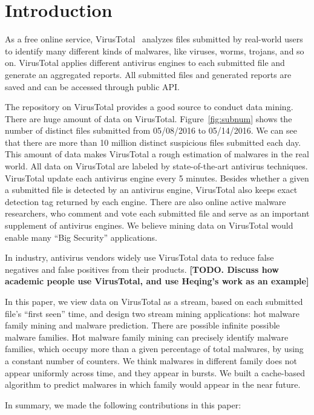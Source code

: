 \section{Introduction}

As a free online service, VirusTotal~\cite{virustotal} analyzes files submitted by real-world users to identify many different kinds of malwares, 
like viruses, worms, trojans, and so on. 
VirusTotal applies different antivirus engines to each submitted file and generate an aggregated reports. 
All submitted files and generated reports are saved and can be accessed through public API. 


The repository on VirusTotal provides a good source to conduct data mining. 
There are huge amount of data on VirusTotal.
Figure~\ref{fig:subnum} shows the number of distinct files submitted from 05/08/2016 to 05/14/2016. 
We can see that there are more than 10 million distinct suspicious files submitted each day. 
This amount of data makes VirusTotal a rough estimation of malwares in the real world. 
All data on VirusTotal are labeled by state-of-the-art antivirus techniques. 
VirusTotal update each antivirus engine every 5 minutes. 
Besides whether a given a submitted file is detected by an antivirus engine, VirusTotal also keeps exact detection tag returned by each engine. 
There are also online active malware researchers, 
who comment and vote each submitted file and serve as an important supplement of antivirus engines. 
We believe mining data on VirusTotal would enable many ``Big Security'' applications. 

In industry, antivirus vendors widely use VirusTotal data to reduce false negatives and false positives from their products. 
{\bf [TODO. Discuss how academic people use VirusTotal, and use Heqing’s work as an example]} 

In this paper, we view data on VirusTotal as a stream, based on each submitted file’s ``first seen'' time, 
and design two stream mining applications: hot malware family mining and malware prediction. 
There are possible infinite possible malware families. 
Hot malware family mining can precisely identify malware families, 
which occupy more than a given percentage of total malwares, by using a constant number of counters.  
We think malwares in different family does not appear uniformly across time, and they appear in bursts. 
We built a cache-based algorithm to predict malwares in which family would appear in the near future. 

In summary, we made the following contributions in this paper:

